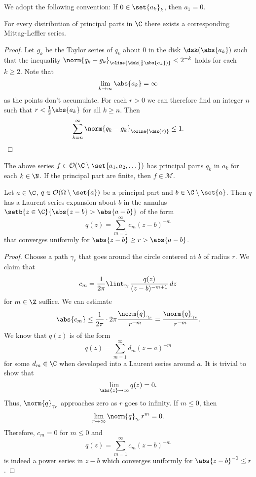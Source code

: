 \begin{opomba}
We adopt the following convention: If $0 \in \set{a_k}_k$, then
$a_1 = 0$.
\end{opomba}

\begin{izrek}
\label{inf_prod:thm:MLforC}
For every distribution of principal parts in $\C$ there exists a
corresponding Mittag-Leffler series.
\end{izrek}

\begin{proof}
Let $g_k$ be the Taylor series of $q_k$ about $0$ in the disk
$\dsk(\abs{a_k})$ such that the inequality
$\norm{q_k - g_k}_{\oline{\dsk(\frac{1}{2} \abs{a_k})}} < 2^{-k}$
holds for each $k \geq 2$. Note that
\[
\lim_{k \to \infty} \abs{a_k} = \infty
\]
as the points don't accumulate. For each $r > 0$ we can therefore
find an integer $n$ such that $r < \frac{1}{2} \abs{a_k}$ for all
$k \geq n$. Then
\[
\sum_{k = n}^{\infty} \norm{q_k - g_k}_{\oline{\dsk(r)}} \leq 1.
\qedhere
\]
\end{proof}

\begin{opomba}
The above series
$f \in \mathcal{O}(\C \setminus \set{a_1, a_2, \dots})$ has
principal parts $q_k$ in $a_k$ for each $k \in \N$. If the
principal part are finite, then $f \in \mathcal{M}$.
\end{opomba}

\begin{lema}
Let $a \in \C$, $q \in \mathcal{O} (\Omega \setminus \set{a})$ be a
principal part and $b \in \C \setminus \set{a}$. Then $q$ has a
Laurent series expansion about $b$ in the annulus
$\setb{z \in \C}{\abs{z - b} > \abs{a - b}}$ of the form
\[
q(z) = \sum_{m=1}^\infty c_m (z-b)^{-m}
\]
that converges uniformly for $\abs{z - b} \geq r > \abs{a - b}$.
\end{lema}

\begin{proof}
Choose a path $\gamma_r$ that goes around the circle centered at
$b$ of radius $r$. We claim that
\[
c_m =
\frac{1}{2 \pi} \lint_{\gamma_r} \frac{q(z)}{(z-b)^{-m+1}}\,dz
\]
for $m \in \Z$ suffice. We can estimate
\[
\abs{c_m} \leq
\frac{1}{2 \pi} \cdot 2 \pi \frac{\norm{q}_{\gamma_r}}{r^{- m}} =
\frac{\norm{q}_{\gamma_r}}{r^{-m}}.
\]
We know that $q(z)$ is of the form
\[
q(z) = \sum_{m = 1}^{\infty} d_m (z - a)^{-m}
\]
for some $d_m \in \C$ when developed into a Laurent series around
$a$. It is trivial to show that
\[
\lim_{\abs{z}\to \infty}q(z) = 0.
\]
Thus, $\norm{q}_{\gamma_r}$ approaches zero as $r$ goes to
infinity. If $m \leq 0$, then
\[
\lim_{r \to \infty} \norm{q}_{\gamma_r} r^{m} = 0.
\]
Therefore, $c_m = 0$ for $m \leq 0$ and
\[
q(z) = \sum_{m = 1}^{\infty} c_m (z - b)^{ - m}
\]
is indeed a power series in $z-b$ which converges uniformly for
$\abs{z - b}^{-1} \leq r$.
\end{proof}


